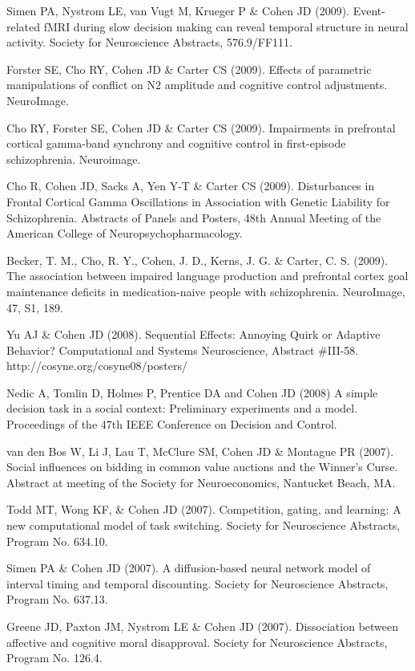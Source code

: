 \documentclass[10 pt]{article}
\begin{document}
Simen PA, Nystrom LE, van Vugt M, Krueger P \& Cohen JD (2009). Event-related fMRI during slow decision making can reveal temporal structure in neural activity. Society for Neuroscience Abstracts, 576.9/FF111.

Forster SE, Cho RY, Cohen JD \& Carter CS (2009). Effects of parametric manipulations of conflict on N2 amplitude and cognitive control adjustments. NeuroImage.

Cho RY, Forster SE, Cohen JD \& Carter CS (2009). Impairments in prefrontal cortical gamma-band synchrony and cognitive control in first-episode schizophrenia. Neuroimage.

Cho R, Cohen JD, Sacks A, Yen Y-T \& Carter CS (2009). Disturbances in Frontal Cortical Gamma Oscillations in Association with Genetic Liability for Schizophrenia. Abstracts of Panels and
Posters, 48th Annual Meeting of the American College of Neuropsychopharmacology.

Becker, T. M., Cho, R. Y., Cohen, J. D., Kerns, J. G. \& Carter, C. S. (2009). The association between impaired language production and prefrontal cortex goal maintenance deficits in medication-naive people with schizophrenia. NeuroImage, 47, S1, 189.

Yu AJ \& Cohen JD (2008). Sequential Effects: Annoying Quirk or Adaptive Behavior? Computational
and Systems Neuroscience, Abstract \#III-58. http://cosyne.org/cosyne08/posters/

Nedic A, Tomlin D, Holmes P, Prentice DA and Cohen JD (2008) A simple decision task in a social context: Preliminary experiments and a model. Proceedings of the 47th IEEE Conference on Decision and Control.

van den Bos W, Li J, Lau T, McClure SM, Cohen JD \& Montague PR (2007). Social influences on bidding in common value auctions and the Winner’s Curse. Abstract at meeting of the Society for
Neuroeconomics, Nantucket Beach, MA.

Todd MT, Wong KF, \& Cohen JD (2007). Competition, gating, and learning: A new computational model of task switching. Society for Neuroscience Abstracts, Program No. 634.10.

Simen PA \& Cohen JD (2007). A diffusion-based neural network model of interval timing and temporal discounting. Society for Neuroscience Abstracts, Program No. 637.13.

Greene JD, Paxton JM, Nystrom LE \& Cohen JD (2007). Dissociation between affective and cognitive moral disapproval. Society for Neuroscience Abstracts, Program No. 126.4.
\end{document}

